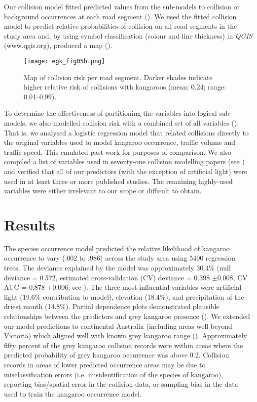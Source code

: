 Our collision model fitted predicted values from the sub-models to collision or background occurrences at each road segment (). We used the fitted collision model to predict relative probabilities of collision on all road segments in the study area and, by using symbol classification (colour and line thickness) in \textit{QGIS} (www.qgis.org), produced a map ().

\begin{figure*}[!t]
  \centering
  \texttt{[image: egk\_fig05b.png]}
  \caption[Map of collision risk per road segment in Victoria]{Map of collision risk per road segment. Darker shades indicate higher relative risk of collisions with kangaroos (mean: 0.24; range: 0.01--0.99).}
  \label{egk_collmap}
\end{figure*}

To determine the effectiveness of partitioning the variables into logical sub-models, we also modelled collision risk with a combined set of all variables (). That is, we analysed a logistic regression model that related collisions directly to the original variables used to model kangaroo occurrence, traffic volume and traffic speed. This emulated past work for purposes of comparison. We also compiled a list of variables used in seventy-one collision modelling papers (see ) and verified that all of our predictors (with the exception of artificial light) were used in at least three or more published studies. The remaining highly-used variables were either irrelevant to our scope or difficult to obtain.

\section{Results}

The species occurrence model predicted the relative likelihood of kangaroo occurrence to vary (.002 to .986) across the study area using 5400 regression trees. The deviance explained by the model was approximately 30.4\% (null deviance = 0.572, estimated cross-validation (CV) deviance = 0.398 $\pm$0.008, CV AUC = 0.878 $\pm$0.006; see ). The three most influential variables were artificial light (19.6\% contribution to model), elevation (18.4\%), and precipitation of the driest month (14.8\%). Partial dependence plots demonstrated plausible relationships between the predictors and grey kangaroo presence (). We extended our model predictions to continental Australia (including areas well beyond Victoria) which aligned well with known grey kangaroo range (). Approximately fifty percent of the grey kangaroo collision records were within areas where the predicted probability of grey kangaroo occurrence was above 0.2. Collision records in areas of lower predicted occurrence areas may be due to misclassification errors (i.e. misidentification of the species of kangaroo), reporting bias/spatial error in the collision data, or sampling bias in the data used to train the kangaroo occurrence model.

